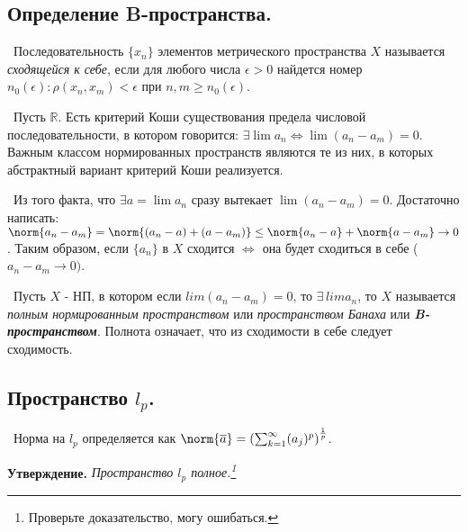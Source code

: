 \subsection*{Определение B-пространства.}

\noindent \textasteriskcentered~Последовательность $\{x_n\}$ элементов метрического пространства $X$ называется \textit{сходящейся к себе}, если для любого числа
 $\epsilon > 0$ найдется номер $n_0(\epsilon) : \rho(x_n, x_m) < \epsilon$ при $n, m \ge n_0(\epsilon)$.

\smallskip
\noindent \checkmark~Пусть $\mathbb{R}$. Есть критерий Коши существования предела числовой последовательности, в котором говорится: 
$\exists \lim a_n \Longleftrightarrow \lim (a_n - a_m) = 0$. Важным классом нормированных пространств являются те из них, в которых абстрактный вариант критерий 
Коши реализуется.

\smallskip
\noindent \checkmark~Из того факта, что $\exists a = \lim a_n$ сразу вытекает $\lim(a_n - a_m) = 0$. Достаточно написать: $\norm{a_n - a_m} = 
\norm{(a_n - a) + (a - a_m)} \le \norm{a_n - a} + \norm{a - a_m} \to 0$. Таким образом, если $\{ a_n \}$ в $X$ сходится $\Longleftrightarrow$ она будет сходиться в себе 
($a_n - a_m \to 0)$.

\smallskip
\noindent \textbullet~Пусть $X$ - НП, в котором если $lim(a_n - a_m) = 0$, то $\exists \, lim a_n$, то $X$ называется \textit{полным нормированным пространством} 
или \textit{пространством Банаха} или \textit{\textbf{B-пространством}}. Полнота означает, что из сходимости в себе следует сходимость.


\subsection*{Пространство $l_p$.}

\noindent \textbullet~Норма на $l_p$ определяется как $\norm{\overline{a}} = \left(\sum_{k = 1}^{\infty}(a_j)^p\right)^\frac{1}{p}$.

\bigskip
\noindent \textbf{Утверждение. }\textit{Пространство $l_p$ полное.\footnote{Проверьте доказательство, могу ошибаться.}}

